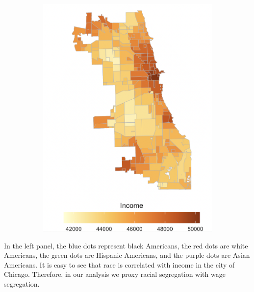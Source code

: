 \documentclass[12pt]{article}
\begin{document}
\begin{figure}[h!]
\begin{subfigure}{0.45\textwidth}
         \includegraphics[width=\linewidth]{Pset1/Figures/Descriptive/income_map.png}
        \label{fig:income_divide}
    \end{subfigure}
\end{figure}
In the left panel, the blue dots represent black Americans, the red dots are white Americans, the green dots are Hispanic Americans, and the purple dots are Asian Americans. It is easy to see that race is correlated with income in the city of Chicago. Therefore, in our analysis we proxy racial segregation with wage segregation. 
\end{document}
